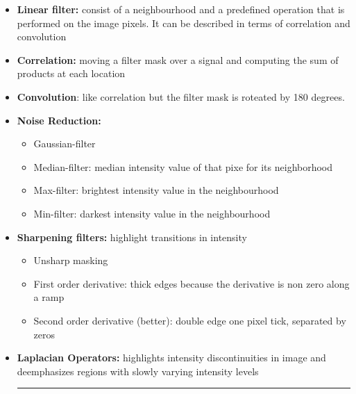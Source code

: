 \documentclass{article}
\begin{document}
\begin{itemize}
    \item \textbf{Linear filter:} consist of a neighbourhood and a predefined operation that is performed on the image pixels. It can be described in terms of correlation and convolution
    \item \textbf{Correlation:} moving a filter mask over a signal and computing the sum of products at each location
    \item \textbf{Convolution}: like correlation but the filter mask is roteated by 180 degrees.
    \item \textbf{Noise Reduction:}
    \begin{itemize}
        \item Gaussian-filter
        \item Median-filter: median intensity value of that pixe for its neighborhood
        \item Max-filter: brightest intensity value in the neighbourhood
        \item Min-filter: darkest intensity value in the neighbourhood
    \end{itemize}
    \item \textbf{Sharpening filters:} highlight transitions in intensity
    \begin{itemize}
        \item Unsharp masking
        \item First order derivative: thick edges because the derivative is non zero along a ramp
        \item Second order derivative (better): double edge one pixel tick, separated by zeros
    \end{itemize}
    \item \textbf{Laplacian Operators:} highlights intensity discontinuities in image and deemphasizes regions with slowly varying intensity levels


    \par\noindent\rule{\textwidth}{0.5pt}
    \par





\end{itemize}
\end{document}
